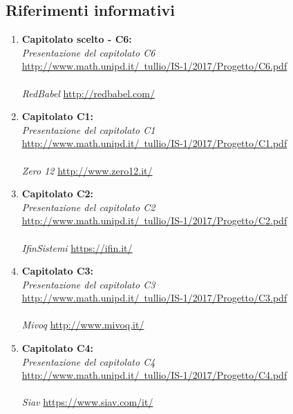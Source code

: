 \documentclass[StudioDiFattibilità.tex]{subfiles}
\begin{document}
\subsection{Riferimenti informativi}
\begin{enumerate}
	\item \textbf{Capitolato scelto - C6:}\\
		\textit{Presentazione del capitolato C6}\\
		\href{http://www.math.unipd.it/~tullio/IS-1/2017/Progetto/C6.pdf}{http://www.math.unipd.it/~tullio/IS-1/2017/Progetto/C6.pdf}\\\\
		\textit{RedBabel} \href{http://redbabel.com/}{http://redbabel.com/}

	\item \textbf{Capitolato C1:}\\
		\textit{Presentazione del capitolato C1}\\
		\href{http://www.math.unipd.it/~tullio/IS-1/2017/Progetto/C1.pdf}{http://www.math.unipd.it/~tullio/IS-1/2017/Progetto/C1.pdf}\\\\
		\textit{Zero 12} \href{http://www.zero12.it/}{http://www.zero12.it/}

	\item \textbf{Capitolato C2:}\\
		\textit{Presentazione del capitolato C2}\\
		\href{http://www.math.unipd.it/~tullio/IS-1/2017/Progetto/C2.pdf}{http://www.math.unipd.it/~tullio/IS-1/2017/Progetto/C2.pdf}\\\\
		\textit{IfinSistemi} \href{https://ifin.it/}{https://ifin.it/}

	\item \textbf{Capitolato C3:}\\
		\textit{Presentazione del capitolato C3}\\
		\href{http://www.math.unipd.it/~tullio/IS-1/2017/Progetto/C3.pdf}{http://www.math.unipd.it/~tullio/IS-1/2017/Progetto/C3.pdf}\\\\
		\textit{Mivoq} \href{http://www.mivoq.it/}{http://www.mivoq.it/}

	\item \textbf{Capitolato C4:}\\
		\textit{Presentazione del capitolato C4}\\
		\href{http://www.math.unipd.it/~tullio/IS-1/2017/Progetto/C4.pdf}{http://www.math.unipd.it/~tullio/IS-1/2017/Progetto/C4.pdf}\\\\
		\textit{Siav} \href{https://www.siav.com/it/}{https://www.siav.com/it/}


\end{enumerate}
\end{document}
